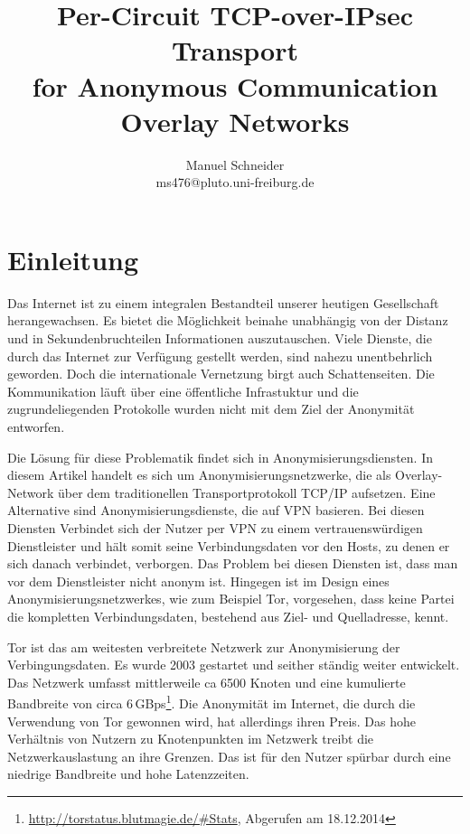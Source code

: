 \documentclass[fleqn,envcountsame,runningheads,10pt,a4paper]{llncs}
\begin{document}
\title{Per-Circuit TCP-over-IPsec Transport \\ for Anonymous Communication Overlay Networks} 
\author{Manuel Schneider \\ ms476@pluto.uni-freiburg.de}
\maketitle
\section{Einleitung}
\label{sec:intro}

Das Internet ist zu einem integralen Bestandteil unserer heutigen Gesellschaft 
herangewachsen. Es bietet die Möglichkeit beinahe unabhängig von der Distanz und 
in Sekundenbruchteilen Informationen auszutauschen. Viele Dienste, die durch das 
Internet zur Verfügung gestellt werden, sind nahezu unentbehrlich geworden. Doch 
die internationale Vernetzung birgt auch Schattenseiten. Die Kommunikation läuft 
über eine öffentliche Infrastuktur und die zugrundeliegenden Protokolle wurden 
nicht mit dem Ziel der Anonymität entworfen.

Die Lösung für diese Problematik findet sich in Anonymisierungsdiensten. In 
diesem Artikel handelt es sich um Anonymisierungsnetzwerke, die als 
Overlay-Network über dem traditionellen Transportprotokoll TCP/IP aufsetzen. 
Eine Alternative sind Anonymisierungsdienste, die auf VPN basieren. Bei diesen 
Diensten Verbindet sich der Nutzer per VPN zu einem vertrauenswürdigen 
Dienstleister und hält somit seine Verbindungsdaten vor den Hosts, zu denen er 
sich danach verbindet, verborgen. Das Problem bei diesen Diensten ist, dass man 
vor dem Dienstleister nicht anonym ist. Hingegen ist im Design eines 
Anonymisierungsnetzwerkes, wie zum Beispiel Tor, vorgesehen, dass keine 
Partei die kompletten Verbindungsdaten, bestehend aus Ziel- und Quelladresse, 
kennt.

Tor ist das am weitesten verbreitete Netzwerk zur Anonymisierung der 
Verbingungsdaten. Es wurde 2003 gestartet und seither ständig weiter entwickelt. 
Das Netzwerk umfasst mittlerweile ca 6500 Knoten und eine kumulierte Bandbreite 
von circa 6\,GBps\footnote{\url{http://torstatus.blutmagie.de/\#Stats}, Abgerufen 
am 18.12.2014}.  Die Anonymität im Internet, die durch die Verwendung von 
Tor gewonnen wird, hat allerdings ihren Preis. Das hohe Verhältnis von 
Nutzern zu Knotenpunkten im Netzwerk treibt die Netzwerkauslastung an ihre 
Grenzen. Das ist für den Nutzer spürbar durch eine niedrige Bandbreite und hohe 
Latenzzeiten.
\end{document}
